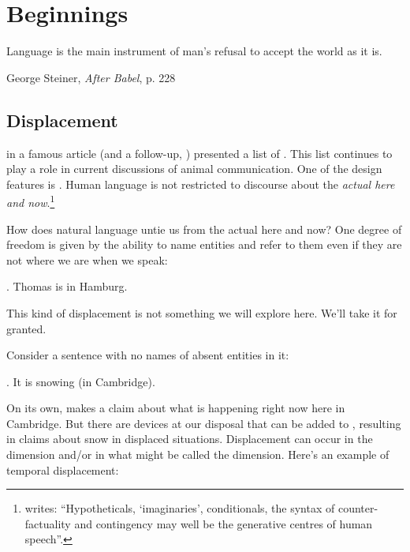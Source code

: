 \chapter{Beginnings}\label{cha:beginnings_of_intensional_semantics} %

\epigraph{Language is the main instrument of man's refusal to accept
  the world as it is.}{George Steiner, \emph{After Babel}, p. 228}


\minitoc

\section{Displacement} \label{sec:displacement}

\citet{hockett:origin:60} in
a famous article (and a follow-up, \citet{hockett:design:68})
presented a list of . This
list continues to play a role in current discussions of animal
communication. One of the design features is .
Human language is not restricted to discourse about the \emph{actual
  here and now}.\footnote{\citet[226]{steiner:1998:babel} writes:
  ``Hypotheticals, `imaginaries', conditionals, the syntax of
  counter-factuality and contingency may well be the generative
  centres of human speech''.}

How does natural language untie us from the actual here and now? One
degree of freedom is given by the ability to name entities and refer
to them even if they are not where we are when we speak:

\ex. Thomas is in Hamburg.

This kind of displacement is not something we will explore here. We'll
take it for granted.

Consider a sentence with no names of absent entities in it:

\ex. It is snowing (in Cambridge).

On its own, \Last makes a claim about what is happening right now here
in Cambridge. But there are devices at our disposal that can be added
to \Last, resulting in claims about snow in displaced situations.
Displacement can occur in the  dimension and/or in what
might be called the  dimension. Here's an example
of temporal displacement:

